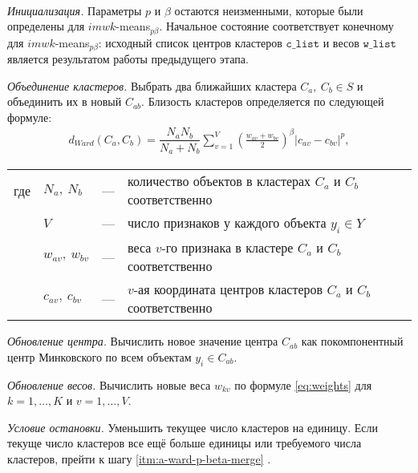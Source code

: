 \documentclass[12pt]{a&t}
\begin{document}
\begin{algorithm} \label{alg:a-ward-p-beta}
	\
	\begin{enumlist}[.] 
		\item \textit{Инициализация.} Параметры $ p $ и $ \beta $ остаются неизменными, которые были определены для \mbox{$ imwk$-means$_{p\beta} $}. Начальное состояние соответствует конечному для \mbox{$ imwk$-means$_{p\beta} $}: исходный список центров кластеров $ \mathtt{c\_list} $ и весов $ \mathtt{w\_list} $ является результатом работы предыдущего этапа.
		
		\item \label{itm:a-ward-p-beta-merge} \textit{Объединение кластеров.} Выбрать два ближайших кластера $ C_a,\:C_b \in S$ и объединить их в новый $ C_{ab} $. Близость кластеров определяется по следующей формуле: 
		\begin{gather} \label{eq:ward-p-beta-distance}
		d_{Ward}(C_a,C_b)=\dfrac{N_aN_b}{N_a+N_b}\sum_{v=1}^{V}\left ( \frac{w_{av}+w_{bv}}{2} \right )^\beta |c_{av}-c_{bv}|^p,
		\end{gather}
		
		\begin{tabular}{llll}
			где & $ N_a,\:N_b $ & {---} & количество объектов в кластерах $ C_a $ и $ C_b $ соответственно \\
			& $ V $ & {---} & число признаков у каждого объекта $ y_i \in Y $ \\
			& $w_{av},\:w_{bv} $ & {---} & веса $ v $-го признака в кластере $ C_a $ и $ C_b $ соответственно \\
			& $ c_{av},\:c_{bv} $ & {---} & $ v $-ая координата центров кластеров $ C_a $ и $ C_b $ соответственно 
		\end{tabular}
		
		\item \textit{Обновление центра.} Вычислить новое значение центра $ C_{ab} $ как покомпонентный центр Минковского по всем объектам $ y_i \in C_{ab} $.
		
		\item \textit{Обновление весов.} Вычислить новые веса $ w_{kv} $ по формуле \ref{eq:weights} для $ k=1,\ldots,K $ и $ v=1,\ldots,V $.
		
		\item \textit{Условие остановки.} Уменьшить текущее число кластеров на единицу. Если текуще число кластеров все ещё больше единицы или требуемого числа кластеров, прейти к шагу \ref{itm:a-ward-p-beta-merge} .
		
		
		
	\end{enumlist}
\end{algorithm}
\end{document}

